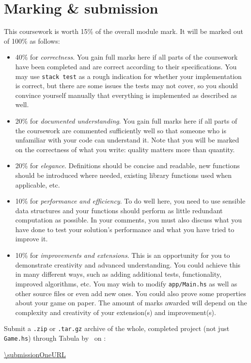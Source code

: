 
\section{Marking \& submission}

This coursework is worth 15\% of the overall module mark. It will be marked out of 100\% as follows:
\begin{itemize}
	\item 40\% for \emph{correctness}. You gain full marks here if all parts of the coursework have been completed and are correct according to their specifications. You may use \texttt{\small stack test} as a rough indication for whether your implementation is correct, but there are some issues the tests may not cover, so you should convince yourself manually that everything is implemented as described as well.
	
	\item 20\% for \emph{documented understanding}. You gain full marks here if all parts of the coursework are commented sufficiently well so that someone who is unfamiliar with your code can understand it. Note that you will be marked on the correctness of what you write: quality matters more than quantity.
	
	\item 20\% for \emph{elegance}. Definitions should be concise and readable, new functions should be introduced where needed, existing library functions used when applicable, etc.
	 
	\item 10\% for \emph{performance and efficiency}. To do well here, you need to use sensible data structures and your functions should perform as little redundant computation as possible. In your comments, you must also discuss what you have done to test your solution's performance and what you have tried to improve it. %
	
	\item 10\% for \emph{improvements and extensions}. This is an opportunity for you to demonstrate creativity and advanced understanding. You could achieve this in many different ways, such as adding additional tests, functionality, improved algorithms, etc. You may wish to modify \texttt{\small app/Main.hs} as well as other source files or even add new ones. You could also prove some properties about your game on paper. The amount of marks awarded will depend on the complexity and creativity of your extension(s) and improvement(s).
\end{itemize}
Submit a \texttt{\small .zip} or \texttt{\small .tar.gz} archive of the whole, completed project (not just \texttt{\small Game.hs}) through Tabula by \deadlineOneTime\ on \deadlineOneDate:
\begin{center} 
	\url{\submissionOneURL}
\end{center}
